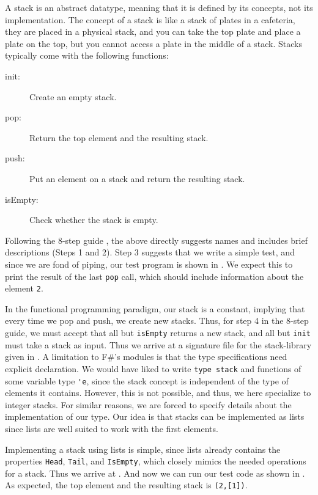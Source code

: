 \documentclass[fsharpNotes.tex]{subfiles}
\begin{document}
A stack is an abstract datatype, meaning that it is defined by its concepts, not its implementation. The concept of a stack is like a stack of plates in a cafeteria, they are placed in a physical stack, and you can take the top plate and place a plate on the top, but you cannot access a plate in the middle of a stack. Stacks typically come with the following functions:
\begin{description}
\item[init:] Create an empty stack.
\item[pop:] Return the top element and the resulting stack.
\item[push:] Put an element on a stack and return the resulting stack.
\item[isEmpty:] Check whether the stack is empty.
\end{description}
Following the 8-step guide , the above directly suggests names and includes brief descriptions (Steps 1 and 2). Step 3 suggests that we write a simple test, and
since we are fond of piping, our test program is shown in .
We expect this to print the result of the last \lstinline{pop} call, which should include information about the element \lstinline{2}.

In the functional programming paradigm, our stack is a constant, implying that every time we pop and push, we create new stacks. Thus, for step 4 in the 8-step guide, we must accept that all but \lstinline{isEmpty} returns a new stack, and all but \lstinline{init} must take a stack as input. Thus we arrive at a signature file for the stack-library given in .
A limitation to F\#'s modules is that the type specifications need explicit declaration. We would have liked to write \lstinline{type stack} and functions of some variable type \lstinline{'e}, since the stack concept is independent of the type of elements it contains. However, this is not possible, and thus, we here specialize to integer stacks. For similar reasons, we are forced to specify details about the implementation of our type. Our idea is that stacks can be implemented as lists since lists are well suited to work with the first elements.

Implementing a stack using lists is simple, since lists already contains the properties \lstinline{Head}, \lstinline{Tail}, and \lstinline{IsEmpty}, which closely mimics the needed operations for a stack. Thus we arrive at .
And now we can run our test code as shown in .
As expected, the top element and the resulting stack is \lstinline{(2,[1])}.
\end{document}
